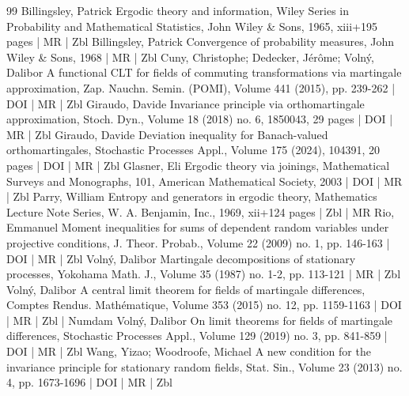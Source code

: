 \begin{thebibliography}{99}
 Billingsley, Patrick Ergodic theory and information, Wiley Series in Probability and Mathematical Statistics, John Wiley \& Sons, 1965, xiii+195 pages | MR | Zbl
 Billingsley, Patrick Convergence of probability measures, John Wiley \& Sons, 1968 | MR | Zbl
 Cuny, Christophe; Dedecker, Jérôme; Volný, Dalibor A functional CLT for fields of commuting transformations via martingale approximation, Zap. Nauchn. Semin. (POMI), Volume 441 (2015), pp. 239-262 | DOI | MR | Zbl
 Giraudo, Davide Invariance principle via orthomartingale approximation, Stoch. Dyn., Volume 18 (2018) no. 6, 1850043, 29 pages | DOI | MR | Zbl
 Giraudo, Davide Deviation inequality for Banach-valued orthomartingales, Stochastic Processes Appl., Volume 175 (2024), 104391, 20 pages | DOI | MR | Zbl
 Glasner, Eli Ergodic theory via joinings, Mathematical Surveys and Monographs, 101, American Mathematical Society, 2003 | DOI | MR | Zbl
 Parry, William Entropy and generators in ergodic theory, Mathematics Lecture Note Series, W. A. Benjamin, Inc., 1969, xii+124 pages | Zbl | MR
 Rio, Emmanuel Moment inequalities for sums of dependent random variables under projective conditions, J. Theor. Probab., Volume 22 (2009) no. 1, pp. 146-163 | DOI | MR | Zbl
 Volný, Dalibor Martingale decompositions of stationary processes, Yokohama Math. J., Volume 35 (1987) no. 1-2, pp. 113-121 | MR | Zbl
 Volný, Dalibor A central limit theorem for fields of martingale differences, Comptes Rendus. Mathématique, Volume 353 (2015) no. 12, pp. 1159-1163 | DOI | MR | Zbl | Numdam
 Volný, Dalibor On limit theorems for fields of martingale differences, Stochastic Processes Appl., Volume 129 (2019) no. 3, pp. 841-859 | DOI | MR | Zbl
 Wang, Yizao; Woodroofe, Michael A new condition for the invariance principle for stationary random fields, Stat. Sin., Volume 23 (2013) no. 4, pp. 1673-1696 | DOI | MR | Zbl
\end{thebibliography}
